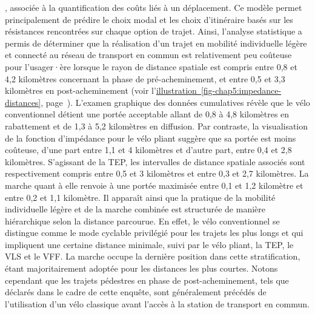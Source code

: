 \begin{refsegment}
{}, associée à la quantification des coûts liés à un déplacement. Ce modèle permet principalement de prédire le choix modal et les choix d'itinéraire basés sur les résistances rencontrées sur chaque option de trajet. Ainsi, l'analyse statistique a permis de déterminer que la réalisation d'un trajet en mobilité individuelle légère et connecté au réseau de transport en commun est relativement peu coûteuse pour l'usager·ère lorsque le rayon de distance spatiale est compris entre 0,8 et 4,2 kilomètres concernant la phase de pré-acheminement, et entre 0,5 et 3,3 kilomètres en post-acheminement (voir l'\hyperref[fig-chap5:impedance-distances]{illustration~\ref{fig-chap5:impedance-distances}}, page~\pageref{fig-chap5:impedance-distances}). L'examen graphique des données cumulatives révèle que le vélo conventionnel détient une portée acceptable allant de 0,8 à 4,8 kilomètres en rabattement et de 1,3 à 5,2 kilomètres en diffusion. Par contraste, la visualisation de la fonction d'impédance pour le vélo pliant suggère que sa portée est moins coûteuse, d'une part entre 1,1 et 4 kilomètres et d'autre part, entre 0,4 et 2,8 kilomètres. S'agissant de la \acrfull{TEP}, les intervalles de distance spatiale associés sont respectivement compris entre 0,5 et 3 kilomètres et entre 0,3 et 2,7 kilomètres. La marche quant à elle renvoie à une portée maximisée entre 0,1 et 1,2 kilomètre et entre 0,2 et 1,1 kilomètre. Il apparaît ainsi que la pratique de la mobilité individuelle légère et de la marche combinée est structurée de manière hiérarchique selon la distance parcourue. En effet, le vélo conventionnel se distingue comme le mode cyclable privilégié pour les trajets les plus longs et qui impliquent une certaine distance minimale, suivi par le vélo pliant, la \acrshort{TEP}, le \acrfull{VLS} et le \acrfull{VFF}. La marche occupe la dernière position dans cette stratification, étant majoritairement adoptée pour les distances les plus courtes. Notons cependant que les trajets pédestres en phase de post-acheminement, tels que déclarés dans le cadre de cette enquête, sont généralement précédés de l'utilisation d'un vélo classique avant l'accès à la station de transport en commun.%


\end{refsegment}
